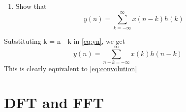 \documentclass[journal,12pt,twocolumn]{IEEEtran}
\renewcommand\thesection{\arabic{section}}
\begin{document}
\begin{enumerate}[label=\thesection.\arabic*]
%

\item Show that
\begin{equation}
\label{eq:yn}
y(n) =  \sum_{k=-\infty}^{\infty}x(n-k)h(k)
\end{equation}
\end{enumerate}

\solution Substituting k = n - k in \eqref{eq:yn}, we get
\begin{equation}
y(n) =  \sum_{n-k=-\infty}^{\infty}x(k)h(n-k)
\end{equation}
This is clearly equivalent to \eqref{eq:convolution}

%

\section{DFT and FFT}
\end{document}
